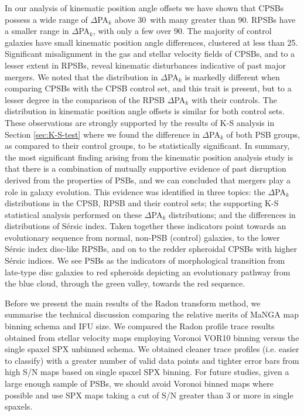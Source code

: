 In our analysis of kinematic position angle offsets we have shown that CPSBs possess a wide range of $\Delta$PA$_{k}$ above 30\textdegree\ with many greater than 90\textdegree. RPSBs have a smaller range in $\Delta$PA$_{k}$, with only a few over 90\textdegree. The majority of control galaxies have small kinematic position angle differences, clustered at less than 25\textdegree. Significant misalignment in the gas and stellar velocity fields of CPSBs, and to a lesser extent in RPSBs, reveal kinematic disturbances indicative of past major mergers.
We noted that the distribution in $\Delta$PA$_{k}$ is markedly different when comparing CPSBs with the CPSB control set, and this trait is present, but to a lesser degree in the comparison of the RPSB $\Delta$PA$_{k}$ with their controls. The distribution in  kinematic position angle offsets is similar for both control sets. These observations are strongly supported by the results of K-S analysis in Section \ref{sec:K-S-test} where we found the difference in $\Delta$PA$_{k}$ of both PSB groups, as compared to their control groups, to be statistically significant. In summary, the most significant finding arising from the kinematic position analysis study is that there is a combination of mutually supportive evidence of past disruption derived from the properties of PSBs, and we can concluded that mergers play a role in galaxy evolution. This evidence was identified in three topics: the $\Delta$PA$_{k}$ distributions in the CPSB, RPSB and their control sets; the supporting K-S statistical analysis performed on these $\Delta$PA$_{k}$ distributions; and the differences in distributions of S\'ersic index. Taken together these indicators point towards an evolutionary sequence from normal, non-PSB (control) galaxies, to the lower S\'ersic index disc-like RPSBs, and on to the redder spheroidal CPSBs with higher S\'ersic indices. We see PSBs as the indicators of morphological transition from late-type disc galaxies to red spheroids depicting an evolutionary pathway from the blue cloud, through the green valley, towards the red sequence.

Before we present the main results of the Radon transform method, we summarise the technical discussion comparing the relative merits of MaNGA map binning schema and IFU size. We compared the Radon profile trace results obtained from stellar velocity maps employing Voronoi VOR10 binning versus the single spaxel SPX unbinned schema. We obtained cleaner trace profiles (i.e. easier to classify) with a greater number of valid data points and tighter error bars from high S/N maps based on single spaxel SPX binning. For future studies, given a large enough sample of PSBs, we should avoid Voronoi binned maps where possible and use SPX maps taking a cut of S/N greater than 3 or more in single spaxels.

